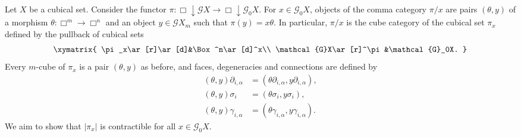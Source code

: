 \documentclass[oneside, 12pt]{amsart}
\numberwithin{equation}{section}
\theoremstyle{plain}
\theoremstyle{definition}
\theoremstyle{remark}
\begin{document}
	Let $X$ be a cubical set. Consider the functor $\pi\colon\Box\downarrow\mathcal{G}X\to\Box\downarrow\mathcal{G}_0X$. For $x\in\mathcal{G}_0X$, objects of the comma category $\pi/x$ are pairs $(\theta,y)$ of a morphism $\theta\colon\Box^m\to\Box^n$ and an object $y\in\mathcal{G}X_m$ such that $\pi(y)=x\theta$. In particular, $\pi/x$ is the cube category of the cubical set $\pi_x$ defined by the pullback of cubical sets
	\[
	\xymatrix{
		\pi_x\ar[r]\ar[d]&\Box^n\ar[d]^x\\
		\mathcal{G}X\ar[r]^\pi&\mathcal{G}_0X.
	}
	\]
	Every $m$-cube of $\pi_x$ is a pair $(\theta,y)$ as before, and faces, degeneracies and connections are defined by
	\begin{align*}
		(\theta,y)\partial_{i,\alpha}&=(\theta\partial_{i,\alpha},y\partial_{i,\alpha}),\\
		(\theta,y)\sigma_i&=(\theta\sigma_i,y\sigma_i),\\
		(\theta,y)\gamma_{i,\alpha}&=(\theta\gamma_{i,\alpha},y\gamma_{i,\alpha}).
	\end{align*}
	We aim to show that $|\pi_x|$ is contractible for all $x\in\mathcal{G}_0X$.
	
	
	
\end{document}
